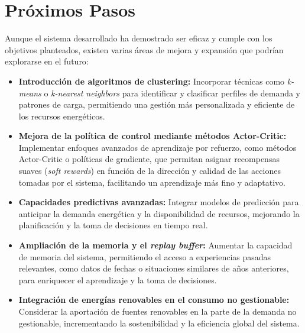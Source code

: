 \section{Próximos Pasos}
Aunque el sistema desarrollado ha demostrado ser eficaz y cumple con los objetivos planteados,
existen varias áreas de mejora y expansión que podrían explorarse en el futuro:
\begin{itemize}
    \item \textbf{Introducción de algoritmos de clustering:} Incorporar técnicas como 
    \textit{k-means} \cite{lloyd1982kmeans} o \textit{k-nearest neighbors} \cite{altman1992knn} para 
    identificar y clasificar perfiles de demanda y patrones de carga, permitiendo una gestión 
    más personalizada y eficiente de los recursos energéticos.
    \item \textbf{Mejora de la política de control mediante métodos Actor-Critic:} Implementar 
    enfoques avanzados de aprendizaje por refuerzo, como métodos Actor-Critic o políticas de 
    gradiente, que permitan asignar recompensas suaves (\textit{soft rewards}) en función de la 
    dirección y calidad de las acciones tomadas por el sistema, facilitando un aprendizaje más fino 
    y adaptativo.
    \item \textbf{Capacidades predictivas avanzadas:} Integrar modelos de predicción para anticipar 
    la demanda energética y la disponibilidad de recursos, mejorando la planificación y la toma de 
    decisiones en tiempo real.
    \item \textbf{Ampliación de la memoria y el \textit{replay buffer}:} Aumentar la capacidad de 
    memoria del sistema, permitiendo el acceso a experiencias pasadas relevantes, como datos de 
    fechas o situaciones similares de años anteriores, para enriquecer el aprendizaje y la toma de 
    decisiones.
    \item \textbf{Integración de energías renovables en el consumo no gestionable:} Considerar la 
    aportación de fuentes renovables en la parte de la demanda no gestionable, incrementando la 
    sostenibilidad y la eficiencia global del sistema.
\end{itemize}